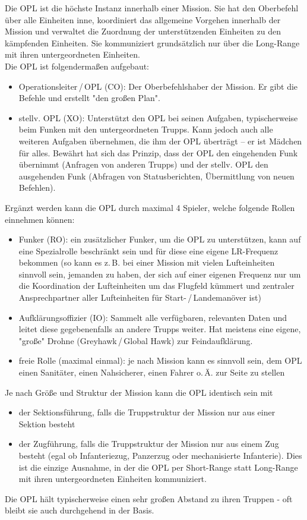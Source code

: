 Die \ac{OPL} ist die höchste Instanz innerhalb einer Mission. Sie hat den Oberbefehl über alle Einheiten inne, koordiniert das allgemeine Vorgehen innerhalb der Mission und verwaltet die Zuordnung der unterstützenden Einheiten zu den kämpfenden Einheiten. Sie kommuniziert grundsätzlich nur über die Long-Range mit ihren untergeordneten Einheiten.\\
Die \ac{OPL} ist folgendermaßen aufgebaut:
\begin{itemize}
	\item Operationsleiter\,/\,\acs{OPL} (\acf{CO}): Der Oberbefehlshaber der Mission. Er gibt die Befehle und erstellt "den großen Plan".
	\item stellv. \ac{OPL} (\acf{XO}): Unterstützt den \ac{OPL} bei seinen Aufgaben, typischerweise beim Funken mit den untergeordneten Trupps. Kann jedoch auch alle weiteren Aufgaben übernehmen, die ihm der \ac{OPL} überträgt -- er ist Mädchen für alles. Bewährt hat sich das Prinzip, dass der \ac{OPL} den eingehenden Funk übernimmt (Anfragen von anderen Trupps) und der stellv. \ac{OPL} den ausgehenden Funk (Abfragen von Statusberichten, Übermittlung von neuen Befehlen).
\end{itemize}
Ergänzt werden kann die \ac{OPL} durch maximal 4 Spieler, welche folgende Rollen einnehmen können:
\begin{itemize}
	\item Funker (\acf{RO}): ein zusätzlicher Funker, um die \ac{OPL} zu unterstützen, kann auf eine Spezialrolle beschränkt sein und für diese eine eigene LR-Frequenz bekommen (so kann es z.\,B. bei einer Mission mit vielen Lufteinheiten sinnvoll sein, jemanden zu haben, der sich auf einer eigenen Frequenz nur um die Koordination der Lufteinheiten um das Flugfeld kümmert und zentraler Ansprechpartner aller Lufteinheiten für Start-\,/\,Landemanöver ist)
	\item Aufklärungsoffizier (\acf{IO}): Sammelt alle verfügbaren, relevanten Daten und leitet diese gegebenenfalls an andere Trupps weiter. Hat meistens eine eigene, "große" Drohne (Greyhawk\,/\,Global Hawk) zur Feindaufklärung.
	\item freie Rolle (maximal einmal): je nach Mission kann es sinnvoll sein, dem \ac{OPL} einen Sanitäter, einen Nahsicherer, einen Fahrer o.\,Ä. zur Seite zu stellen
\end{itemize}
Je nach Größe und Struktur der Mission kann die \ac{OPL} identisch sein mit
\begin{itemize}
	\item der Sektionsführung, falls die Truppstruktur der Mission nur aus einer Sektion besteht
	\item der Zugführung, falls die Truppstruktur der Mission nur aus einem Zug besteht (egal ob Infanteriezug, Panzerzug oder mechanisierte Infanterie). Dies ist die einzige Ausnahme, in der die \ac{OPL} per Short-Range statt Long-Range mit ihren untergeordneten Einheiten kommuniziert.
\end{itemize}
Die OPL hält typischerweise einen sehr großen Abstand zu ihren Truppen - oft bleibt sie auch durchgehend in der Basis.
